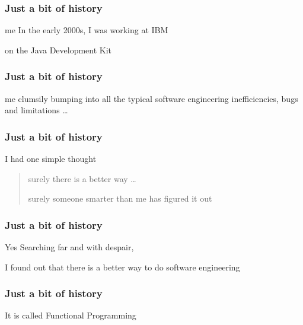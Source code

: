 \begin{frame}
\frametitle{Just a bit of history}
\begin{block}{me}
In the early 2000s, I was working at IBM

on the Java Development Kit
\end{block}
\end{frame}

\begin{frame}
\frametitle{Just a bit of history}
\begin{block}{me}
clumsily bumping into all the typical software engineering inefficiencies, bugs and limitations \ldots
\end{block}
\end{frame}

\begin{frame}
\frametitle{Just a bit of history}
\begin{block}{I had one simple thought}
\begin{quote}
surely there is a better way \ldots

surely someone smarter than me has figured it out
\end{quote}
\end{block}
\end{frame}

\begin{frame}
\frametitle{Just a bit of history}
\begin{block}{Yes}
Searching far and with despair,

I found out that there is a better way to do software engineering
\end{block}
\end{frame}

\begin{frame}
\frametitle{Just a bit of history}
\begin{center}
It is called Functional Programming
\end{center}
\end{frame}
